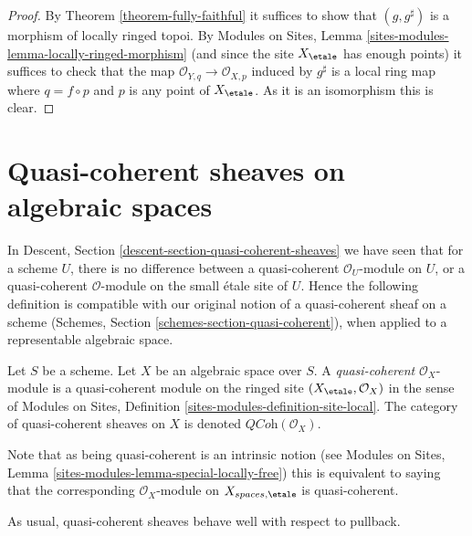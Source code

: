 \begin{proof}
By
Theorem \ref{theorem-fully-faithful}
it suffices to show that $(g, g^\sharp)$ is a morphism of
locally ringed topoi. By
Modules on Sites, Lemma \ref{sites-modules-lemma-locally-ringed-morphism}
(and since the site $X_\etale$ has enough points)
it suffices to check that the map
$\mathcal{O}_{Y, q} \to \mathcal{O}_{X, p}$ induced by $g^\sharp$
is a local ring map where $q = f \circ p$ and $p$ is any point of
$X_\etale$. As it is an isomorphism this is clear.
\end{proof}














\section{Quasi-coherent sheaves on algebraic spaces}
\label{section-quasi-coherent}

\noindent
In
Descent, Section \ref{descent-section-quasi-coherent-sheaves}
we have seen that for a scheme $U$, there is no difference between a
quasi-coherent $\mathcal{O}_U$-module on $U$, or a quasi-coherent
$\mathcal{O}$-module on the small \'etale site of $U$. Hence the following
definition is compatible with our original notion of a quasi-coherent sheaf
on a scheme
(Schemes, Section \ref{schemes-section-quasi-coherent}),
when applied to a representable algebraic space.

\begin{definition}
\label{definition-quasi-coherent}
Let $S$ be a scheme. Let $X$ be an algebraic space over $S$.
A {\it quasi-coherent} $\mathcal{O}_X$-module
is a quasi-coherent module on the ringed site
$(X_\etale, \mathcal{O}_X)$ in the sense of
Modules on Sites,
Definition \ref{sites-modules-definition-site-local}.
The category of quasi-coherent sheaves on $X$ is denoted
$\textit{QCoh}(\mathcal{O}_X)$.
\end{definition}

\noindent
Note that as being quasi-coherent is an intrinsic notion (see
Modules on Sites, Lemma \ref{sites-modules-lemma-special-locally-free})
this is equivalent to saying that the corresponding $\mathcal{O}_X$-module
on $X_{spaces, \etale}$ is quasi-coherent.

\medskip\noindent
As usual, quasi-coherent sheaves behave well with respect to pullback.

